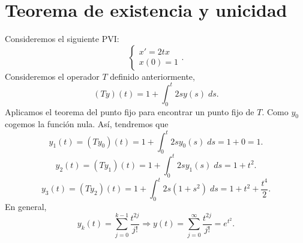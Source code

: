 \section{Teorema de existencia y unicidad}

\begin{eg}
	Consideremos el siguiente PVI:
	\[
	\begin{cases}
	x' = 2tx \\
	x\left(0\right)=1
	\end{cases}
	.\]
Consideremos el operador $\displaystyle T $ definido anteriormente,
\[\left(Ty\right)\left(t\right)= 1 + \int^{t}_{0} 2sy\left(s\right) \; d s .\]
Aplicamos el teorema del punto fijo para encontrar un punto fijo de $\displaystyle T $. Como $\displaystyle y_{0} $ cogemos la función nula. Así, tendremos que 
\[y_{1}\left(t\right)=\left(Ty_{0}\right)\left(t\right)=1 + \int^{t}_{0} 2s y_{0}\left(s\right) \; d s = 1 + 0 = 1 .\]
\[y_{2}\left(t\right)=\left(Ty_{1}\right)\left(t\right)=1 + \int^{t}_{0} 2sy_{1}\left(s\right) \; d s = 1 + t ^{2}.\]
\[y_{3}\left(t\right)=\left(Ty_{2}\right)\left(t\right)=1 + \int^{t}_{0} 2s\left(1 + s^{2}\right) \; d s = 1 + t ^{2} + \frac{t ^{4}}{2} .\]
En general, 
\[y_{k}\left(t\right)=\sum^{k-1}_{j = 0}\frac{t ^{2j}}{j!} \Rightarrow y\left(t\right)=\sum^{\infty}_{j = 0}\frac{t ^{2j}}{j!}=e^{t ^{2}} .\]
\end{eg}

